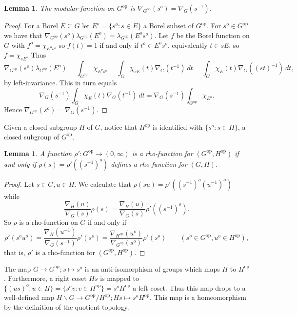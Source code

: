 \documentclass[11pt,a4paper]{article}
\newtheorem{lemma}[theorem]{Lemma}
\theoremstyle{definition}
\newcommand{\bs}{\backslash}
\newcommand{\op}{{\operatorname{op}}}
\begin{document}
\begin{lemma}
The modular function on $G^\op$ is $\nabla_{G^\op}(s^o) = \nabla_G(s^{-1})$.
\end{lemma}
\begin{proof}
For a Borel $E\subseteq G$ let $E^o = \{s^o: s\in E\}$ a Borel subset of $G^\op$.  For
$s^o\in G^\op$ we have that $\nabla_{G^\op}(s^o) \lambda_{G^\op}(E^o) =
\lambda_{G^\op}(E^o s^o)$.  Let $f$ be the Borel function on $G$ with $f^o = 
\chi_{E^o s^o}$ so $f(t)=1$ if and only if $t^o \in E^o s^o$, equivalently
$t \in sE$, so $f = \chi_{sE}$.  Thus
\[ \nabla_{G^\op}(s^o) \lambda_{G^\op}(E^o) = \int_{G^\op} \chi_{E^os^o}
= \int_G \chi_{sE}(t) \nabla_G(t^{-1}) \ dt
= \int_G \chi_E(t) \nabla_G((st)^{-1}) \ dt, \]
by left-invariance.  This in turn equals
\[ \nabla_G(s^{-1}) \int_G \chi_E(t) \nabla_G(t^{-1}) \ dt
= \nabla_G(s^{-1}) \int_{G^\op} \chi_{E^o}. \]
Hence $\nabla_{G^\op}(s^o) = \nabla_G(s^{-1})$.
\end{proof}

Given a closed subgroup $H$ of $G$, notice that $H^\op$ is identified with $\{s^o:s\in H \}$,
a closed subgroup of $G^\op$.

\begin{lemma}
A function $\rho':G^\op\rightarrow(0,\infty)$ is a rho-function for $(G^\op, H^\op)$ if
and only if $\rho(s) = \rho'((s^{-1})^o)$ defines a rho-function for $(G,H)$.
\end{lemma}
\begin{proof}
Let $s\in G, u\in H$.  We calculate that $\rho(su) = \rho'((s^{-1})^o (u^{-1})^o)$
while
\[ \frac{\nabla_H(u)}{\nabla_G(s)} \rho(s)
= \frac{\nabla_H(u)}{\nabla_G(s)} \rho'((s^{-1})^o). \]
So $\rho$ is a rho-function on $G$ if and only if
\[ \rho'(s^o u^o) = \frac{\nabla_H(u^{-1})}{\nabla_G(s^{-1})} \rho'(s^o)
= \frac{\nabla_{H^\op}(u^o)}{\nabla_{G^\op}(s^o)} \rho'(s^o)
\qquad (s^o\in G^\op, u^o\in H^\op), \]
that is, $\rho'$ is a rho-function for $(G^\op,H^\op)$.
\end{proof}

The map $G\rightarrow G^\op; s \mapsto s^o$ is an anti-isomorphism of groups which maps
$H$ to $H^\op$.  Furthermore, a right coset $Hs$ is mapped to $\{ (us)^o : u\in H \}
= \{ s^o v : v\in H^\op \} = s^o H^\op$ a left coset.  Thus this map drops to a well-defined
map $H \bs G \rightarrow G^\op / H^\op; Hs \mapsto s^o H^\op$.  This map is a homeomorphism
by the definition of the quotient topology.
\end{document}
